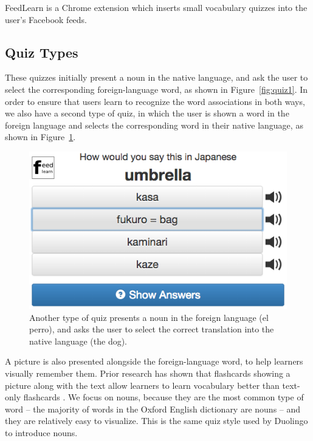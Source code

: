 \documentclass{chi-ext}
\begin{document}
FeedLearn is a Chrome extension which inserts small vocabulary quizzes into the user's Facebook feeds.

\subsection{Quiz Types}

These quizzes initially present a noun in the native language, and ask the user to select the corresponding foreign-language word, as shown in Figure~\ref{fig:quiz1}. In order to ensure that users learn to recognize the word associations in both ways, we also have a second type of quiz, in which the user is shown a word in the foreign language and selects the corresponding word in their native language, as shown in Figure~\ref{fig:quiz2}.

\begin{figure}
\centering
\includegraphics[width=2.0\columnwidth]{quiz2}
\caption{Another type of quiz presents a noun in the foreign language (el perro), and asks the user to select the correct translation into the native language (the dog).}
\label{fig:quiz2}
\end{figure}

A picture is also presented alongside the foreign-language word, to help learners visually remember them. Prior research has shown that flashcards showing a picture along with the text allow learners to learn vocabulary better than text-only flashcards \cite{multimediavocabulary}. We focus on nouns, because they are the most common type of word -- the majority of words in the Oxford English dictionary are nouns \cite{microlearning} -- and they are relatively easy to visualize. This is the same quiz style used by Duolingo to introduce nouns.
\end{document}
